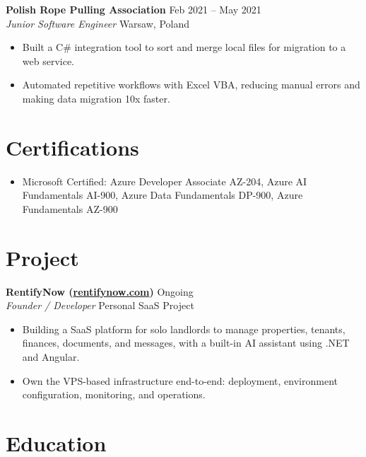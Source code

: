 \documentclass[a4paper,10pt]{article}
\newcommand{\resumeSubheading}[4]{
  \textbf{#1} \hfill #2 \\
  \textit{#3} \hfill #4 \\
}
\begin{document}
\resumeSubheading
  {Polish Rope Pulling Association}
  {Feb 2021 -- May 2021}
  {Junior Software Engineer}
  {Warsaw, Poland}
\vspace{-10pt}

\begin{itemize}
  \item Built a C\# integration tool to sort and merge local files for
        migration to a web service.
  \item Automated repetitive workflows with Excel VBA, reducing manual
        errors and making data migration 10x faster.
\end{itemize}

\section*{Certifications}

\begin{itemize}
  \item Microsoft Certified: Azure Developer Associate AZ-204, Azure AI Fundamentals AI-900, Azure Data Fundamentals DP-900, Azure Fundamentals AZ-900
\end{itemize}

\vspace{-4pt}

\section*{Project}

\resumeSubheading
  {RentifyNow (\href{https://rentifynow.com}{rentifynow.com})}
  {Ongoing}
  {Founder / Developer}
  {Personal SaaS Project}
  \vspace{-10pt}

\begin{itemize}
  \item Building a SaaS platform for solo landlords to manage properties,
        tenants, finances, documents, and messages, with a built-in AI
        assistant using .NET and Angular.
  \item Own the VPS-based infrastructure end-to-end: deployment,
        environment configuration, monitoring, and operations.
\end{itemize}

\vspace{-4pt}

\section*{Education}
\end{document}
